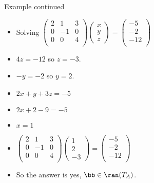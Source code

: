 \documentclass[handout]{beamer}
\begin{document}

\begin{frame}{Example continued}

\begin{itemize}
\item Solving
$
\begin{pmatrix}
2 & 1 &  3 \\
0 & -1 & 0 \\
0 & 0 &  4 \\
\end{pmatrix}
\begin{pmatrix}
x \\ y \\ z
\end{pmatrix}
=
\begin{pmatrix}
 -5 \\
 -2 \\
 -12 \\
\end{pmatrix}
$
\item $4z=-12$ so $z=-3$.
\item $-y = -2$ so $y=2$.
\item $2x +y +3z = -5$
\item $2x + 2  -9 = -5$
\item $x=1$
\item
$
\begin{pmatrix}
2 & 1 &  3 \\
0 & -1 & 0 \\
0 & 0 &  4 \\
\end{pmatrix}
\begin{pmatrix}
1 \\ 2 \\ -3
\end{pmatrix}
=
\begin{pmatrix}
 -5 \\
 -2 \\
 -12 \\
\end{pmatrix}
$
\item So the answer is yes, $\bb\in\ran(T_A)$.
\end{itemize}

\end{frame}

\end{document}
